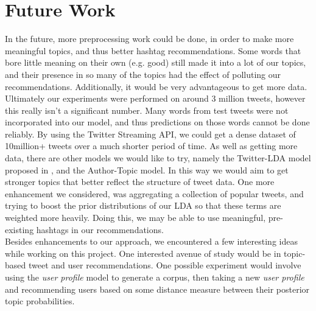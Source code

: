 \documentclass{acm_proc_article-sp}
\begin{document}
\section{Future Work}
\hspace*{5mm}In the future, more preprocessing work could be done, in order to make more meaningful topics, and thus better hashtag recommendations. Some words that bore little meaning on their own (e.g. good) still made it into a lot of our topics, and their presence in so many of the topics had the effect of polluting our recommendations. Additionally, it would be very advantageous to get more data. Ultimately our experiments were performed on around 3 million tweets, however this really isn't a significant number. Many words from test tweets were not incorporated into our model, and thus predictions on those words cannot be done reliably. By using the Twitter Streaming API, we could get a dense dataset of 10million+ tweets over a much shorter period of time. As well as getting more data, there are other models we would like to try, namely the Twitter-LDA model proposed in \cite{zhao2011comparing}, and the Author-Topic model. In this way we would aim to get stronger topics that better reflect the structure of tweet data. One more enhancement we considered, was aggregating a collection of popular tweets, and trying to boost the prior distributions of our LDA so that these terms are weighted more heavily. Doing this, we may be able to use meaningful, pre-existing hashtags in our recommendations.\\
\hspace*{5mm}Besides enhancements to our approach, we encountered a few interesting ideas while working on this project. One interested avenue of study would be in topic-based tweet and user recommendations. One possible experiment would involve using the \textit{user profile} model to generate a corpus, then taking a new \textit{user profile} and recommending users based on some distance measure between their posterior topic probabilities.
\end{document}
